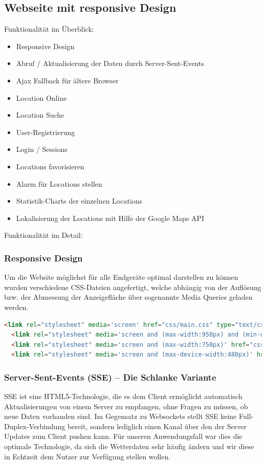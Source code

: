 \documentclass{report}
\begin{document}
\subsection{Webseite mit responsive Design}
Funktionalität im Überblick:
\begin{itemize}
\item Responsive Design
\item Abruf / Aktualisierung der Daten durch Server-Sent-Events
\item Ajax Fallback für ältere Browser
\item Location Online
\item Location Suche
\item User-Registrierung
\item Login / Sessions
\item Locations favorisieren
\item Alarm für Locations stellen
\item Statistik-Charts der einzelnen Locations
\item Lokalisierung der Locations mit Hilfe der Google Maps API
\end{itemize}
Funktionalität im Detail:

\subsubsection{Responsive Design}
Um die Website möglichst für alle Endgeräte optimal darstellen zu können wurden verschiedene CSS-Dateien angefertigt, welche abhängig von der Auflösung bzw. der Abmessung der Anzeigefläche über sogenannte Media Queries geladen werden.

\begin{lstlisting}[language = HTML, caption=Designanpassung je nach Endgerät, label=cbsp1]
<link rel="stylesheet" media='screen' href="css/main.css" type="text/css" />
  <link rel="stylesheet" media='screen and (max-width:950px) and (min-width: 750px)' href="css/med.css" type="text/css" />
  <link rel="stylesheet" media='screen and (max-width:750px)' href="css/small.css" type="text/css" />
  <link rel="stylesheet" media='screen and (max-device-width:480px)' href="css/mobile.css" type="text/css" />
\end{lstlisting}

\subsubsection{Server-Sent-Events (SSE) – \glqq Die Schlanke Variante\grqq}
SSE ist eine HTML5-Technologie, die es dem Client ermöglicht automatisch Aktualisierungen von einem Server zu empfangen, ohne Fragen zu müssen, ob neue Daten vorhanden sind.
Im Gegensatz zu Websockets stellt SSE keine Full-Duplex-Verbindung bereit, sondern lediglich einen Kanal über den der Server Updates zum Client pushen kann.
Für unseren Anwendungsfall war dies die optimale Technologie, da sich die Wetterdaten sehr häufig ändern und wir diese in Echtzeit dem Nutzer zur Verfügung stellen wollen.
\end{document}

